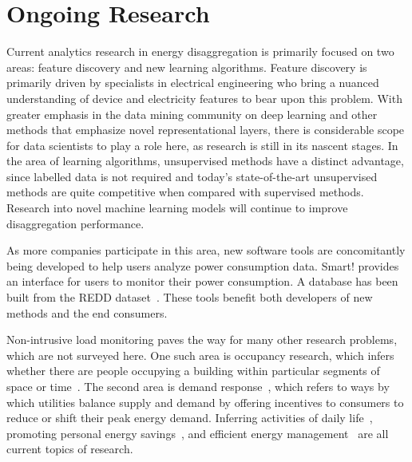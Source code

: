 \section{Ongoing Research}
\label{sec:ongoing}
Current analytics
research in energy disaggregation is primarily focused on two areas: 
feature discovery and new learning algorithms.
Feature discovery is primarily driven by
specialists in electrical engineering who bring a nuanced
understanding of device and electricity features to bear upon this
problem. With greater emphasis in the data mining community on deep
learning and other methods that emphasize novel representational
layers, there is considerable scope for data scientists to play
a role here, as research is still in its nascent stages.
In the area of 
learning algorithms, unsupervised methods have a distinct advantage, since
labelled data is not required and today's state-of-the-art
unsupervised methods are quite competitive when compared with supervised
methods. 
Research into novel machine learning models will continue to
improve disaggregation performance.

As more companies participate in this area,
new software tools are concomitantly
being developed to help users analyze power consumption data.
Smart!\cite{barker2012smart} provides an interface 
for users to monitor their power consumption. 
A database has been built from the REDD dataset~\cite{lai2012database}.
These tools benefit both developers of new methods and the end consumers.

Non-intrusive load monitoring paves the way for many other research problems,
which are not surveyed here.
One such area
is occupancy research, which infers whether there are people occupying a
building within particular segments of space or time~\cite{chen2013non}.
The second area is demand response~\cite{albadi2007demand}, 
which refers to ways by which utilities balance supply and demand by 
offering incentives to consumers to reduce or shift their peak energy
demand.
Inferring activities of daily life~\cite{song2014short}, 
promoting personal energy savings~\cite{lee2014personalized}, and
efficient energy management~\cite{collins2012smart} are all current
topics of research.


